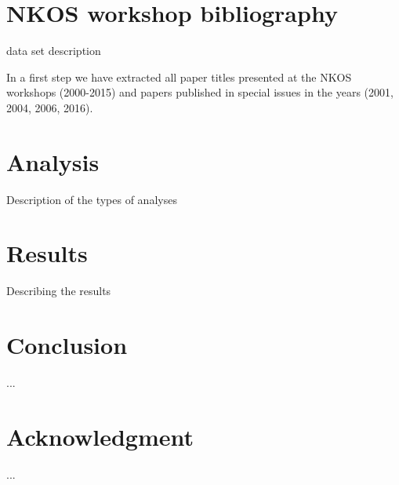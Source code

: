 \documentclass[runningheads,a4paper]{llncs}
\begin{document}
\section{NKOS workshop bibliography}\label{dataset}
data set description %

In a first step we have extracted all paper titles presented at the NKOS workshops (2000-2015) and papers published in special issues in the years (2001, 2004, 2006, 2016).




\section{Analysis}\label{analysis}
Description of the types of analyses %

\section{Results}\label{results}
Describing the results %




\section{Conclusion}\label{concl}
...%

\section{Acknowledgment}\label{sec:ACKNOWLEDGMENTS}
...

\newpage

 
\end{document}
